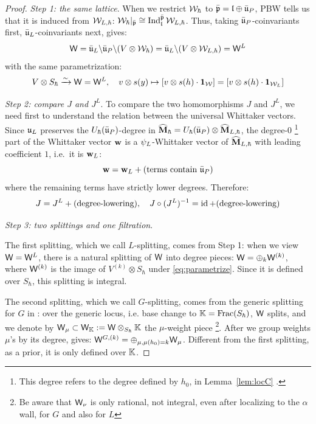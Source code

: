 \documentclass{article}
\theoremstyle{plain}
\theoremstyle{definition}
\theoremstyle{remark}
\numberwithin{equation}{section}
\begin{document}
\begin{proof}
\emph{Step 1: the same lattice}. When we restrict $\mathcal{W}_\hbar$ to $\bar{\mathfrak{p}} = \mathfrak{l} \oplus \bar{\mathfrak{u}}_P$, PBW tells us that it is induced from $\mathcal{W}_{L,\hbar}$: $\mathcal{W}_\hbar|_{\bar{\mathfrak{p}}} \cong \operatorname{Ind}_{\mathfrak{l}}^{\bar{\mathfrak{p}}} \mathcal{W}_{L,\hbar}$. Thus, taking $\bar{\mathfrak{u}}_P$-coinvariants first, $\bar{\mathfrak{u}}_L$-coinvariants next, gives:
\begin{equation*}
    \mathsf W = \bar{\mathfrak{u}}_L\backslash \bar{\mathfrak{u}}_P \backslash (V\otimes \mathcal{W}_{\hbar}) = \bar{\mathfrak{u}}_L \backslash (V\otimes \mathcal{W}_{L,\hbar})= \mathsf W^L
\end{equation*}
with the same parametrization:
\begin{equation}\label{eq:parametrize}
    V\otimes S_\hbar \xrightarrow{\sim} \mathsf W = \mathsf W^L, \quad v\otimes s(y) \mapsto [v\otimes s(h)\cdot \mathbf 1_{\mathcal{W}}] = [v\otimes s(h)\cdot \mathbf 1_{\mathcal{W}_L}]
\end{equation}

\emph{Step 2: compare $J$ and $J^L$}. To compare the two homomorphisms $J$ and $J^L$, we need first to understand the relation between the universal Whittaker vectors. Since $\mathfrak{u}_L$ preserves the $U_\hbar(\bar{\mathfrak{u}}_P)$-degree in $\widehat{\mathbf M}_\hbar=U_\hbar(\bar{\mathfrak{u}}_P)\otimes\widehat{\mathbf{M}}_{L,\hbar}$, the degree-$0$ \footnote{This degree refers to the degree defined by $h_0$, in Lemma~\ref{lem:locC} .} part of the Whittaker vector $\mathbf w$ is a $\psi_L$-Whittaker vector of $\widehat{\mathbf{M}}_{L,\hbar}$ with leading coefficient $1$, i.e.\ it is $\mathbf w_L$:
\begin{equation*}
    \mathbf w = \mathbf w_L + (\text{terms contain } \bar{\mathfrak{u}}_P)
\end{equation*}
 where the remaining terms have strictly lower degrees. Therefore:
\begin{equation*}
    J = J^L +(\text{degree-lowering}),\quad J\circ (J^L)^{-1} = \operatorname{id} + (\text{degree-lowering})
\end{equation*}

\emph{Step 3: two splittings and one filtration}. 

The first splitting, which we call $L$-splitting, comes from Step 1: when we view $\mathsf W = \mathsf W^L$, there is a natural splitting of $\mathsf W$ into degree pieces:
$\mathsf W = \oplus_k \mathsf W^{(k)}$, where $\mathsf W^{(k)}$ is the image of $V^{(k)} \otimes S_\hbar$ under \eqref{eq:parametrize}. Since it is defined over $S_\hbar$, this splitting is integral. 

The second splitting, which we call $G$-splitting, comes from the generic splitting for $G$ in \cite[Section 5]{bezrukavnikov2026equivariantsatakecategorykostantwhittaker}: over the generic locus, i.e. base change to $\mathbb K = \mathrm{Frac} (S_\hbar)$, $\mathsf W$ splits, and we denote by $\mathsf W_\mu \subset \mathsf W_\mathbb K := \mathsf W \otimes_{S_\hbar} \mathbb K$ the $\mu$-weight piece \footnote{Be aware that $\mathsf W_\nu$ is only rational, not integral, even after localizing to the $\alpha$ wall, for $G$ and also for $L$}. After we group weights $\mu$'s by its degree, gives: $\mathsf W^{G,(k)} = \oplus_{\mu, \mu(h_0) =k} \mathsf W_\mu $. Different from the first splitting, as a prior, it is only defined over $\mathbb K$.


\end{proof}
\end{document}
